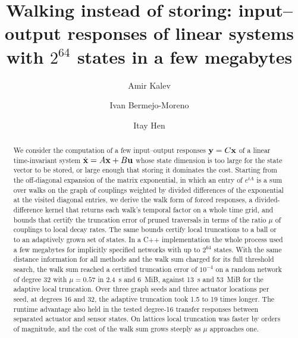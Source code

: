 \documentclass[aps,pra,superscriptaddress,floatfix,longbibliography,twocolumn]{revtex4-2}
\newcommand{\bx}{{\bf x}}
\newcommand{\bu}{{\bf u}}
\newcommand{\by}{{\bf y}}
\begin{document}
\title{Walking instead of storing: input--output responses of linear systems with $2^{64}$ states in a few megabytes}
\author{Amir Kalev}
\author{Ivan Bermejo-Moreno}
\author{Itay Hen}

\begin{abstract}
We consider the computation of a few input--output responses $\by=C\bx$ of a linear time-invariant system $\dot\bx=A\bx+B\bu$ whose state dimension is too large for the state vector to be stored, or large enough that storing it dominates the cost. Starting from the off-diagonal expansion of the matrix exponential, in which an entry of $e^{tA}$ is a sum over walks on the graph of couplings weighted by divided differences of the exponential at the visited diagonal entries, we derive the walk form of forced responses, a divided-difference kernel that returns each walk's temporal factor on a whole time grid, and bounds that certify the truncation error of pruned traversals in terms of the ratio $\mu$ of couplings to local decay rates. The same bounds certify local truncations to a ball or to an adaptively grown set of states. In a C++ implementation the whole process used a few megabytes for implicitly specified networks with up to $2^{64}$ states. With the same distance information for all methods and the walk sum charged for its full threshold search, the walk sum reached a certified truncation error of $10^{-4}$ on a random network of degree 32 with $\mu=0.57$ in 2.4~s and 6~MiB, against 13~s and 53~MiB for the adaptive local truncation. Over three graph seeds and three actuator locations per seed, at degrees 16 and 32, the adaptive truncation took 1.5 to 19 times longer. The runtime advantage also held in the tested degree-16 transfer responses between separated actuator and sensor states. On lattices local truncation was faster by orders of magnitude, and the cost of the walk sum grows steeply as $\mu$ approaches one.
\end{abstract}
\maketitle
\end{document}
